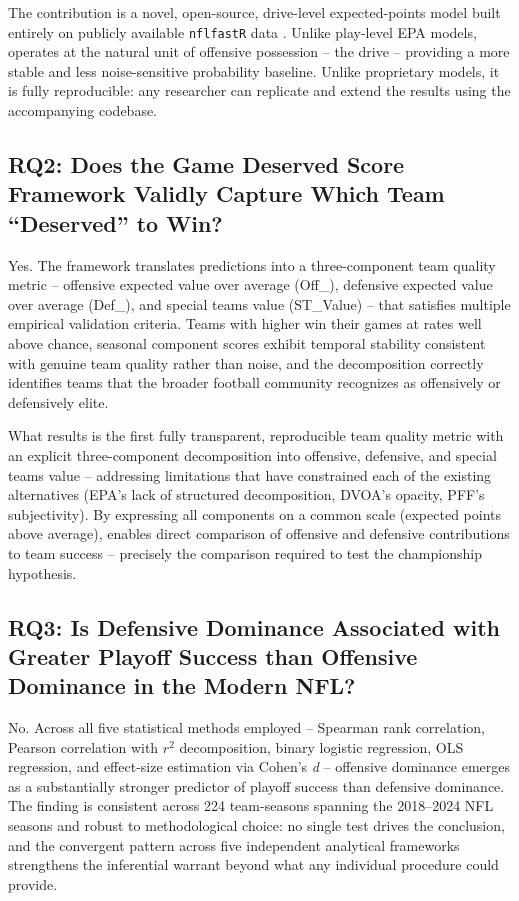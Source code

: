 The contribution is a novel, open-source, drive-level expected-points model built entirely on publicly available \texttt{nflfastR} data \parencite{carl2021nflfastr}. Unlike play-level EPA models, \xscore{} operates at the natural unit of offensive possession  -- the drive  -- providing a more stable and less noise-sensitive probability baseline. Unlike proprietary models, it is fully reproducible: any researcher can replicate and extend the results using the accompanying codebase.

\subsection{RQ2: Does the Game Deserved Score Framework Validly Capture Which Team ``Deserved'' to Win?}
\label{sec:rq2-answer}

Yes. The \gds{} framework translates \xscore{} predictions into a three-component team quality metric  -- offensive expected value over average (Off\_\xvoa{}), defensive expected value over average (Def\_\xvoa{}), and special teams value (ST\_Value)  -- that satisfies multiple empirical validation criteria. Teams with higher \gds{} win their games at rates well above chance, seasonal component scores exhibit temporal stability consistent with genuine team quality rather than noise, and the decomposition correctly identifies teams that the broader football community recognizes as offensively or defensively elite.

What results is the first fully transparent, reproducible team quality metric with an explicit three-component decomposition into offensive, defensive, and special teams value  -- addressing limitations that have constrained each of the existing alternatives (EPA's lack of structured decomposition, DVOA's opacity, PFF's subjectivity). By expressing all components on a common scale (expected points above average), \gds{} enables direct comparison of offensive and defensive contributions to team success  -- precisely the comparison required to test the championship hypothesis.

\subsection{RQ3: Is Defensive Dominance Associated with Greater Playoff Success than Offensive Dominance in the Modern NFL?}
\label{sec:rq3-answer}

No. Across all five statistical methods employed  -- Spearman rank correlation, Pearson correlation with $r^2$ decomposition, binary logistic regression, OLS regression, and effect-size estimation via Cohen's \emph{d}  -- offensive dominance emerges as a substantially stronger predictor of playoff success than defensive dominance. The finding is consistent across 224 team-seasons spanning the 2018--2024 NFL seasons and robust to methodological choice: no single test drives the conclusion, and the convergent pattern across five independent analytical frameworks strengthens the inferential warrant beyond what any individual procedure could provide.

